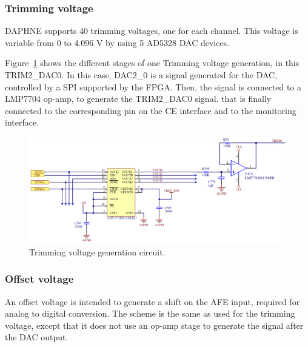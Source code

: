 \subsubsection{Trimming voltage}

DAPHNE supports 40 trimming voltages, one for each channel. This voltage is variable from 0 to 4.096 V by using 5 AD5328 DAC devices. 

Figure~\ref{fig:TrimmCircuit} shows the different stages of one Trimming voltage generation, in this TRIM2\_DAC0. In this case, DAC2\_0 is a signal generated for the DAC, controlled by a SPI supported by the FPGA. Then, the signal is connected to a LMP7704 op-amp, to generate the TRIM2\_DAC0 signal. that is finally connected to the corresponding pin on the CE interface and to the monitoring interface.

\begin{figure}[htbp]
\centering %
\includegraphics[width=.8\textwidth,origin=c,angle=0]{Images/TRIMCircuit_v2.png}
\caption{\label{fig:TrimmCircuit} Trimming voltage generation circuit.}
\end{figure}

\subsubsection{Offset voltage}

An offset voltage is intended to generate a shift on the AFE input, required for analog to digital conversion. The scheme is the same as used for the trimming voltage, except that it does not use an op-amp stage to generate the signal after the DAC output.

